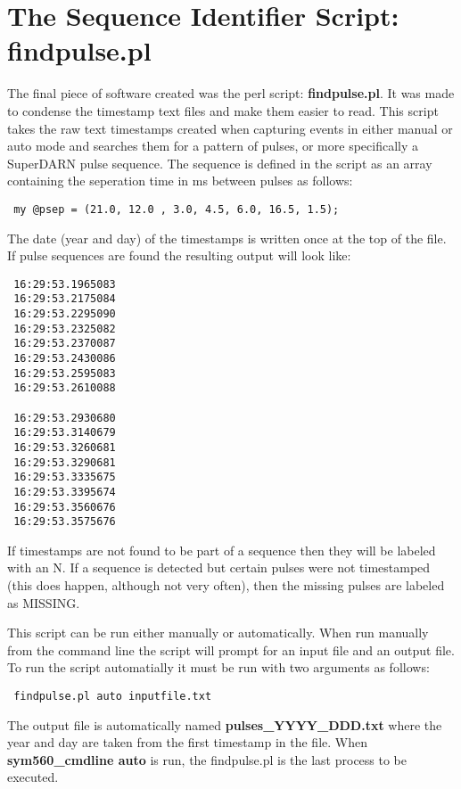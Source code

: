 \documentclass[11pt]{article}
\begin{document}



\section{The Sequence Identifier Script: findpulse.pl} \label{seqscript}

The final piece of software created was the perl script: \textbf{findpulse.pl}.  It was made to condense the timestamp text files and make them easier to read.  This script takes the raw text timestamps created when capturing events in either manual or auto mode and searches them for a pattern of pulses, or more specifically a SuperDARN pulse sequence.  The sequence is defined in the script as an array containing the seperation time in ms between pulses as follows:
\begin{verbatim}
 my @psep = (21.0, 12.0 , 3.0, 4.5, 6.0, 16.5, 1.5);
\end{verbatim}
The date (year and day) of the timestamps is written once at the top of the file.
If pulse sequences are found the resulting output will look like:
\begin{verbatim}
 16:29:53.1965083
 16:29:53.2175084
 16:29:53.2295090
 16:29:53.2325082
 16:29:53.2370087
 16:29:53.2430086
 16:29:53.2595083
 16:29:53.2610088

 16:29:53.2930680
 16:29:53.3140679
 16:29:53.3260681
 16:29:53.3290681
 16:29:53.3335675
 16:29:53.3395674
 16:29:53.3560676
 16:29:53.3575676
\end{verbatim}
If timestamps are not found to be part of a sequence then they will be labeled with an N.  If a sequence is detected but certain pulses were not timestamped (this does happen, although not very often), then the missing pulses are labeled as MISSING.

This script can be run either manually or automatically.  When run manually from the command line the script will prompt for an input file and an output file.  To run the script automatially it must be run with two arguments as follows:
\begin{verbatim}
 findpulse.pl auto inputfile.txt
\end{verbatim}
The output file is automatically named \textbf{pulses\_YYYY\_DDD.txt} where the year and day are taken from the first timestamp in the file.  When \textbf{sym560\_cmdline auto} is run, the findpulse.pl is the last process to be executed.  
\end{document}
